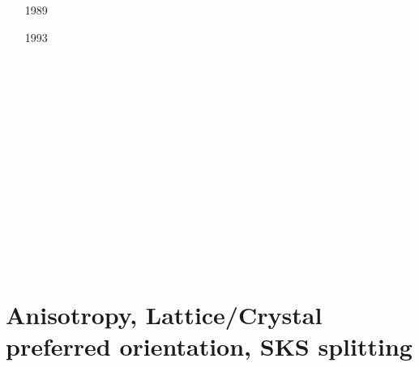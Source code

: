 \begin{scriptsize}
\begin{itemize}
\item[1989]
\textcite{brbe89b} \\
\item[1993]
\textcite{gowo93} \\
\item[\twothousandthree]
\textcite{hube03} \\
\item[\twothousandsix]
\textcite{coma06} \\
\item[\twothousandeight]
\textcite{vanv08} \\
\textcite{naht08} \\
\item[\twothousandeleven]
\textcite{vanj11} \\
\item[\twothousandfourteen]
\textcite{buge14} \\
\textcite{flgw14} \\
\item[\twothousandfifteen]
\textcite{svlh15} \\
\item[\twothousandsixteen]
\textcite{frsc16} \\
\end{itemize}
\end{scriptsize}


\section{Anisotropy, Lattice/Crystal preferred orientation, SKS splitting}
\label{sec:topics:anisotropy}

